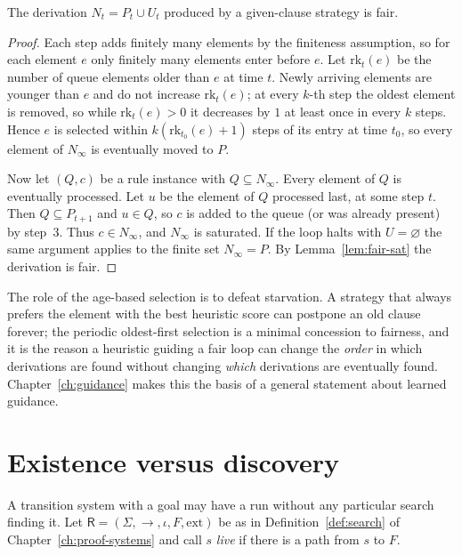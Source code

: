 \begin{proposition}
\label{prop:given-clause-fair}
The derivation $N_t=P_t\cup U_t$ produced by a given-clause strategy is fair.
\end{proposition}

\begin{proof}
Each step adds finitely many elements by the finiteness assumption, so for each element $e$ only finitely many elements enter before $e$. Let $\mathrm{rk}_t(e)$ be the number of queue elements older than $e$ at time $t$. Newly arriving elements are younger than $e$ and do not increase $\mathrm{rk}_t(e)$; at every $k$-th step the oldest element is removed, so while $\mathrm{rk}_t(e)>0$ it decreases by $1$ at least once in every $k$ steps. Hence $e$ is selected within $k(\mathrm{rk}_{t_0}(e)+1)$ steps of its entry at time $t_0$, so every element of $N_\infty$ is eventually moved to $P$.

Now let $(Q,c)$ be a rule instance with $Q\subseteq N_\infty$. Every element of $Q$ is eventually processed. Let $u$ be the element of $Q$ processed last, at some step $t$. Then $Q\subseteq P_{t+1}$ and $u\in Q$, so $c$ is added to the queue (or was already present) by step~3. Thus $c\in N_\infty$, and $N_\infty$ is saturated. If the loop halts with $U=\varnothing$ the same argument applies to the finite set $N_\infty=P$. By Lemma~\ref{lem:fair-sat} the derivation is fair.
\end{proof}

The role of the age-based selection is to defeat starvation. A strategy that always prefers the element with the best heuristic score can postpone an old clause forever; the periodic oldest-first selection is a minimal concession to fairness, and it is the reason a heuristic guiding a fair loop can change the \emph{order} in which derivations are found without changing \emph{which} derivations are eventually found. Chapter~\ref{ch:guidance} makes this the basis of a general statement about learned guidance.

\section{Existence versus discovery}
\label{sec:existence}

A transition system with a goal may have a run without any particular search finding it. Let $\mathsf{R}=(\Sigma,\to,\iota,F,\mathrm{ext})$ be as in Definition~\ref{def:search} of Chapter~\ref{ch:proof-systems} and call $s$ \emph{live} if there is a path from $s$ to $F$.

